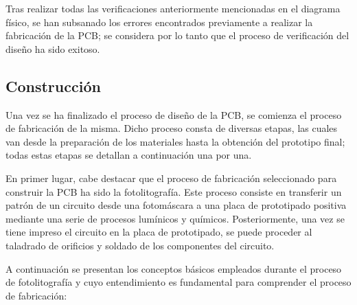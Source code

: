 Tras realizar todas las verificaciones anteriormente mencionadas en el diagrama físico, se han subsanado los errores encontrados previamente a realizar la fabricación de la PCB; se considera por lo tanto que el proceso de verificación del diseño ha sido exitoso.

\subsection{Construcción}

Una vez se ha finalizado el proceso de diseño de la PCB, se comienza el proceso de fabricación de la misma. Dicho proceso consta de diversas etapas, las cuales van desde la preparación de los materiales hasta la obtención del prototipo final; todas estas etapas se detallan a continuación una por una.

En primer lugar, cabe destacar que el proceso de fabricación seleccionado para construir la PCB ha sido la fotolitografía. Este proceso consiste en transferir un patrón de un circuito desde una fotomáscara a una placa de prototipado positiva mediante una serie de procesos lumínicos y químicos. Posteriormente, una vez se tiene impreso el circuito en la placa de prototipado, se puede proceder al taladrado de orificios y soldado de los componentes del circuito.

A continuación se presentan los conceptos básicos empleados durante el proceso de fotolitografía y cuyo entendimiento es fundamental para comprender el proceso de fabricación:

